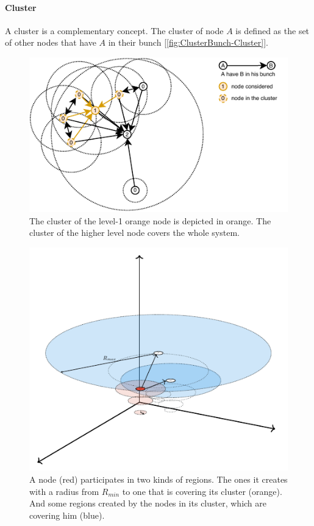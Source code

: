 \documentclass[a4paper,11pt,twoside=semi,openright]{report}
\begin{document}
\paragraph{Cluster} A cluster is a complementary concept. The cluster of node
$A$ is defined as the set of other nodes that have $A$ in their bunch
[\autoref{fig:ClusterBunch-Cluster}]. 

\begin{figure}[!h] 
\centering
\includegraphics[width=350pt]{figures/ClusterBunch-Cluster}
\caption{The cluster of the level-1 orange node is depicted in orange. The
    cluster of the higher level node covers the whole system.}
  \label{fig:ClusterBunch-Cluster}
\end{figure}

\begin{figure}[!h] 
\centering
\includegraphics[width=350pt]{figures/regions/ellipsis}
\caption{ A node (red) participates in two kinds of regions. The ones it
    creates with a radius from $R_{min}$ to one that is covering its cluster
    (orange). And some regions created by the nodes in its cluster, which are
    covering him (blue).} \label{fig:RegionCreation}
\end{figure}
\end{document}
